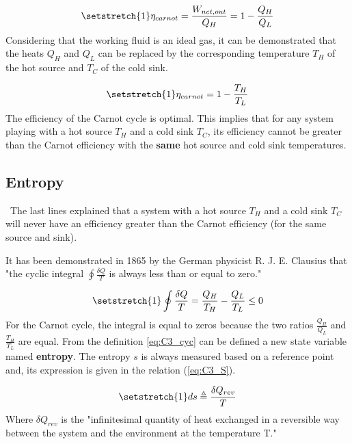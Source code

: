 \begin{equation}
\setstretch{1}
\eta_{carnot} = \frac{W_{net,out}}{Q_H} = 1 - \frac{Q_H}{Q_L}\label{eq:C3_Carnoteff}
\end{equation} 
Considering that the working fluid is an ideal gas, it can be demonstrated that the heats $Q_H$ and $Q_L$ can be replaced by the corresponding temperature $T_H$ of the hot source and $T_C$ of the cold sink.

\begin{equation}
\setstretch{1}
\eta_{carnot}=1-\frac{T_H}{T_L}\label{eq:C3_eff_carnot}
\end{equation} 
The efficiency of the Carnot cycle is optimal. This implies that for any system playing with a hot source $T_H$ and a cold sink $T_C$, its efficiency cannot be greater than the Carnot efficiency with the \textbf{same} hot source and cold sink temperatures.
\subsection{Entropy}
\quad\ The last lines explained that a system with a hot source $T_H$ and a cold sink $T_C$ will never have an efficiency greater than the Carnot efficiency (for the same source and sink).

It has been demonstrated in 1865 by the German physicist R. J. E. Clausius that "the cyclic integral $\oint\frac{\delta Q}{T}$ is always less than or equal to zero."\cite{2015}

\begin{equation}
\setstretch{1}
\oint\frac{\delta Q}{T} = \frac{Q_H}{T_H} - \frac{Q_L}{T_L}\leq 0\label{eq:C3_cyc}
\end{equation}
For the Carnot cycle, the integral is equal to zeros because the two ratios $\frac{Q_H}{Q_L}$ and $\frac{T_H}{T_L}$ are equal.
From the definition \ref{eq:C3_cyc} can be defined a new state variable named \textbf{entropy}. The entropy $s$ is always measured based on a reference point and, its expression is given in the relation (\ref{eq:C3_S}).

\begin{equation}
\setstretch{1}
ds \triangleq \frac{\delta Q_{rev}}{T}\label{eq:C3_S}
\end{equation}
Where $\delta Q_{rev}$ is the "infinitesimal quantity of heat exchanged in a reversible way between the system and the environment at the temperature T."\cite{Dewallef2019} 

